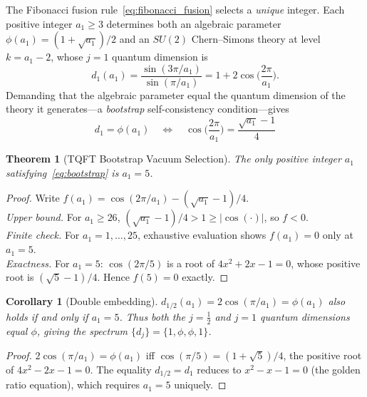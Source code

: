 \documentclass[12pt,a4paper]{article}
\newtheorem{theorem}{Theorem}
\newtheorem{corollary}{Corollary}
\theoremstyle{definition}
\begin{document}
The Fibonacci fusion rule~\eqref{eq:fibonacci_fusion} selects a \emph{unique} integer.  Each positive integer $a_1 \ge 3$ determines both an algebraic parameter $\phi(a_1) = (1 + \sqrt{a_1})/2$ and an $SU(2)$ Chern--Simons theory at level $k = a_1 - 2$, whose $j = 1$ quantum dimension is
\begin{equation}
d_1(a_1) = \frac{\sin(3\pi/a_1)}{\sin(\pi/a_1)} = 1 + 2\cos\!\Big(\frac{2\pi}{a_1}\Big).
\end{equation}
Demanding that the algebraic parameter equal the quantum dimension of the theory it generates---a \emph{bootstrap} self-consistency condition---gives
\begin{equation}
\label{eq:bootstrap}
\boxed{d_1 = \phi(a_1) \quad\Longleftrightarrow\quad \cos\!\Big(\frac{2\pi}{a_1}\Big) = \frac{\sqrt{a_1} - 1}{4}}
\end{equation}

\begin{theorem}[TQFT Bootstrap Vacuum Selection]
\label{thm:bootstrap}
The only positive integer $a_1$ satisfying~\eqref{eq:bootstrap} is $a_1 = 5$.
\end{theorem}

\begin{proof}
Write $f(a_1) = \cos(2\pi/a_1) - (\sqrt{a_1} - 1)/4$.\\
\emph{Upper bound.}  For $a_1 \ge 26$, $(\sqrt{a_1} - 1)/4 > 1 \ge |\cos(\cdot)|$, so $f < 0$.\\
\emph{Finite check.}  For $a_1 = 1, \dots, 25$, exhaustive evaluation shows $f(a_1) = 0$ only at $a_1 = 5$.\\
\emph{Exactness.}  For $a_1 = 5$: $\cos(2\pi/5)$ is a root of $4x^2 + 2x - 1 = 0$, whose positive root is $(\sqrt{5} - 1)/4$.  Hence $f(5) = 0$ exactly.
\end{proof}

\begin{corollary}[Double embedding]
\label{cor:double}
$d_{1/2}(a_1) = 2\cos(\pi/a_1) = \phi(a_1)$ also holds if and only if $a_1 = 5$.  Thus both the $j = \tfrac12$ and $j = 1$ quantum dimensions equal $\phi$, giving the spectrum $\{d_j\} = \{1, \phi, \phi, 1\}$.
\end{corollary}

\begin{proof}
$2\cos(\pi/a_1) = \phi(a_1)$ iff $\cos(\pi/5) = (1+\sqrt{5})/4$, the positive root of $4x^2 - 2x - 1 = 0$.  The equality $d_{1/2} = d_1$ reduces to $x^2 - x - 1 = 0$ (the golden ratio equation), which requires $a_1 = 5$ uniquely.
\end{proof}
\end{document}
